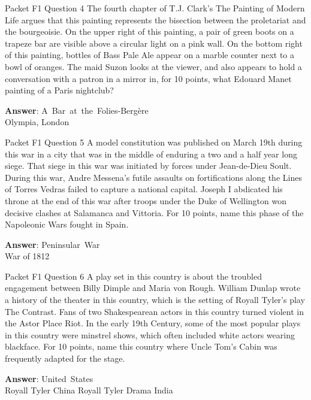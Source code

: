 \begin{frame}{Packet F1 Question 4}
The fourth chapter of T.J. Clark’s The Painting of Modern Life argues that this painting represents the   bisection between the proletariat and the bourgeoisie. On the upper right of this painting, a pair of green boots on a trapeze bar are visible   above a circular light on a pink wall. On the bottom right   of this painting, bottles of Bass Pale Ale appear on a marble counter next to a bowl of oranges.   The maid Suzon looks at the viewer, and also appears to hold a conversation with a patron in a mirror in, for 10 points, what Edouard Manet   painting of a Paris nightclub?

\textbf{Answer}: A\ Bar\ at\ the\ Folies-Bergère\\
 Olympia, London
\end{frame}

\begin{frame}{Packet F1 Question 5}
A model constitution was published on March 19th during this war in a city that was in the middle of enduring a two and a half year long siege. That siege in this war was initiated by forces under Jean-de-Dieu Soult. During this war, Andre Messena’s   futile assaults on fortifications along the Lines of Torres Vedras failed     to capture a national capital. Joseph I abdicated his throne at the end of this war after troops under the Duke of Wellington won decisive   clashes at Salamanca and Vittoria. For 10 points, name this phase of the Napoleonic Wars fought in   Spain.

\textbf{Answer}: Peninsular\ War\\
 War of 1812
\end{frame}

\begin{frame}{Packet F1 Question 6}
A play set in this country is about the troubled engagement between Billy Dimple and Maria von Rough. William Dunlap wrote a history of the theater in this country,   which is the setting of Royall Tyler’s play The Contrast. Fans of two Shakespearean actors in this country turned violent in the Astor Place Riot. In the early 19th Century, some of the most popular plays in this country were minstrel shows, which often included white actors wearing blackface. For 10 points, name this country where Uncle Tom’s Cabin was frequently adapted for the stage.        

\textbf{Answer}: United\ States\\
 Royall Tyler
 China
 Royall Tyler
 Drama
 India
\end{frame}

